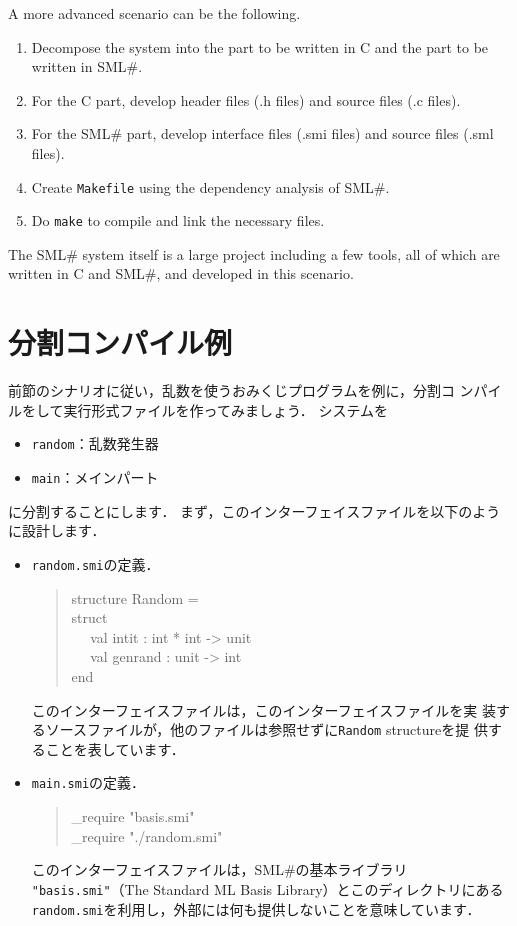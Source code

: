 \documentclass{jbook}
\newif\ifjp
\newcommand{\txt}[2]{#1}
\newcommand{\smlsharp}{SML\#}
\newcommand{\myem}{\mbox{\ \ }}
\newenvironment{program}{\begin{quote}\begin{tt}}%
                        {\end{tt}\end{quote}}
\begin{document}
	A more advanced scenario can be the following.
\begin{enumerate}
\item Decompose the system into the part to be written in C and the part
to be written in \smlsharp{}.
\item For the C part, develop header files (.h files) and source files
(.c files). 
\item For the \smlsharp{} part, develop interface files (.smi files)
and source files (.sml files).
\item Create {\tt Makefile} using the dependency analysis of \smlsharp{}.
\item Do {\tt make} to compile and link the necessary files.
\end{enumerate}
	The \smlsharp{} system itself is a large project including a few
tools, all of which are written in C and \smlsharp{}, and developed in
this scenario.
\fi%

\section{\txt{分割コンパイル例}{Separate compilation example}}
\label{sec:tutorialSeparateCompilationExample}

\ifjp%
	前節のシナリオに従い，乱数を使うおみくじプログラムを例に，分割コ
ンパイルをして実行形式ファイルを作ってみましょう．
	システムを
\begin{itemize}
\item {\tt random}：乱数発生器
\item {\tt main}：メインパート
\end{itemize}
に分割することにします．
	まず，このインターフェイスファイルを以下のように設計します．
\begin{itemize}
\item {\tt random.smi}の定義．
\begin{program}
structure Random =
\\
struct
\\\myem
  val intit : int * int -> unit
\\\myem
  val genrand : unit -> int
\\
end
\end{program}
	このインターフェイスファイルは，このインターフェイスファイルを実
装するソースファイルが，他のファイルは参照せずに{\tt Random} structureを提
供することを表しています．
\item {\tt main.smi}の定義．
\begin{program}
\_require "basis.smi"\\
\_require "./random.smi"
\end{program}
	このインターフェイスファイルは，\smlsharp{}の基本ライブラリ{\tt
"basis.smi"}（The Standard ML Basis Library）とこのディレクトリにある
{\tt random.smi}を利用し，外部には何も提供しないことを意味しています．
\end{itemize}
\end{document}
